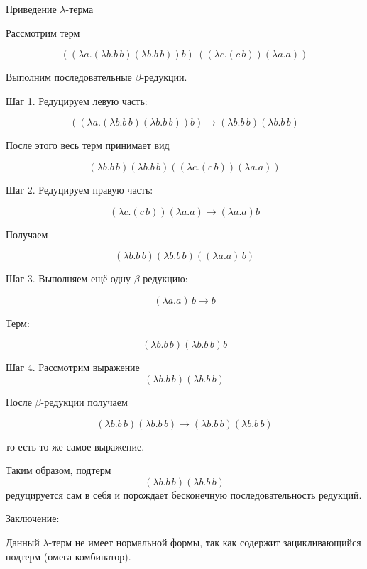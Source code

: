 \documentclass{article}
\begin{document}
Приведение $\lambda$-терма

Рассмотрим терм

\[((\lambda a.(\lambda b.b\,b)(\lambda b.b\,b))b)\
((\lambda c.(c\, b)) (\lambda a.a))\]

Выполним последовательные $\beta$-редукции.

Шаг 1. Редуцируем левую часть:

\[((\lambda a.(\lambda b.b\,b)(\lambda b.b\,b))b)\to
(\lambda b.b\,b)(\lambda b.b\,b)\]

После этого весь терм принимает вид

\[(\lambda b.b\,b)(\lambda b.b\,b)
((\lambda c.(c\, b))(\lambda a.a))\]

Шаг 2. Редуцируем правую часть:

\[(\lambda c.(c\, b))(\lambda a.a)\to
(\lambda a.a)b\]

Получаем

\[(\lambda b.b\,b)(\lambda b.b\,b)
((\lambda a.a)\, b)\]

Шаг 3. Выполняем ещё одну $\beta$-редукцию:

\[(\lambda a.a)\, b \to b\]

Терм:

\[(\lambda b.b\,b)(\lambda b.b\,b) b\]

Шаг 4. Рассмотрим выражение
\[(\lambda b.b\,b)(\lambda b.b\,b)\]

После $\beta$-редукции получаем

\[(\lambda b.b\,b)(\lambda b.b\,b)\to
(\lambda b.b\,b)(\lambda b.b\,b)\]

то есть то же самое выражение.

Таким образом, подтерм
\[(\lambda b.b\,b)(\lambda b.b\,b)\]
редуцируется сам в себя и порождает бесконечную последовательность редукций.

Заключение:

Данный $\lambda$-терм не имеет нормальной формы, так как содержит
зацикливающийся подтерм (омега-комбинатор).
\end{document}

